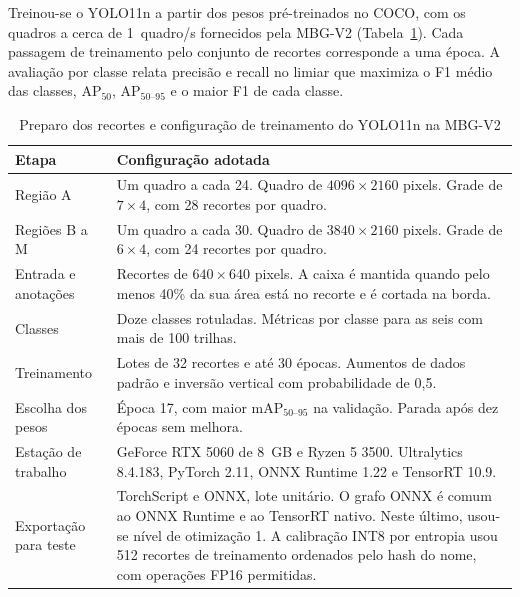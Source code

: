 Treinou-se o YOLO11n \cite{jocher2024yolo11} a partir dos pesos pré-treinados no COCO, com os quadros a cerca de 1~quadro/s fornecidos pela MBG-V2 (Tabela~\ref{tab_preparo_detector}). Cada passagem de treinamento pelo conjunto de recortes corresponde a uma época. A avaliação por classe relata precisão e recall no limiar que maximiza o F1 médio das classes, AP$_{50}$, AP$_{50\text{--}95}$ e o maior F1 de cada classe.

\begin{table}[!htbp]
  \centering
  \caption{Preparo dos recortes e configuração de treinamento do YOLO11n na MBG-V2}
  \label{tab_preparo_detector}
  \small
  \renewcommand{\arraystretch}{1.14}
  \begin{tabular}{@{}p{}p{}@{}}
    \hline
    Etapa & Configuração adotada \\
    \hline
    Região A & Um quadro a cada 24. Quadro de $4096\times2160$ pixels. Grade de $7\times4$, com 28 recortes por quadro. \\
    Regiões B a M & Um quadro a cada 30. Quadro de $3840\times2160$ pixels. Grade de $6\times4$, com 24 recortes por quadro. \\
    Entrada e anotações & Recortes de $640\times640$ pixels. A caixa é mantida quando pelo menos 40\% da sua área está no recorte e é cortada na borda. \\
    Classes & Doze classes rotuladas. Métricas por classe para as seis com mais de 100 trilhas. \\
    Treinamento & Lotes de 32 recortes e até 30 épocas. Aumentos de dados padrão e inversão vertical com probabilidade de 0,5. \\
    Escolha dos pesos & Época 17, com maior mAP$_{50\text{--}95}$ na validação. Parada após dez épocas sem melhora. \\
    Estação de trabalho & GeForce RTX 5060 de 8~GB e Ryzen 5 3500. Ultralytics 8.4.183, PyTorch 2.11, ONNX Runtime 1.22 e TensorRT 10.9. \\
    Exportação para teste & TorchScript e ONNX, lote unitário. O grafo ONNX é comum ao ONNX Runtime e ao TensorRT nativo. Neste último, usou-se nível de otimização 1. A calibração INT8 por entropia usou 512 recortes de treinamento ordenados pelo hash do nome, com operações FP16 permitidas. \\
    \hline
  \end{tabular}
\end{table}

